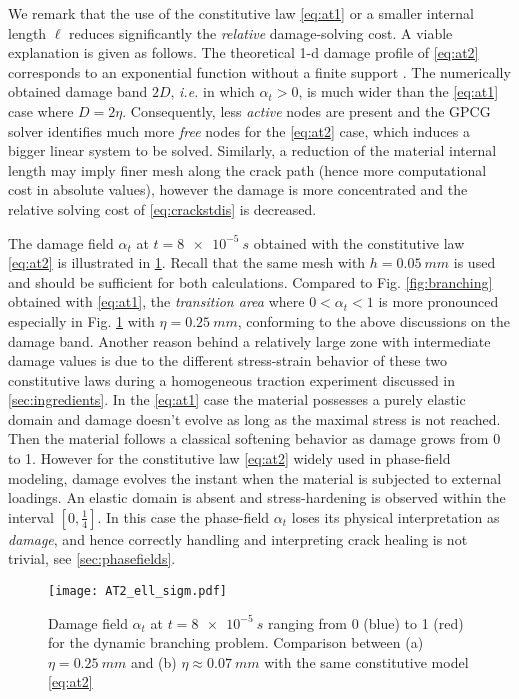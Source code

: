 We remark that the use of the constitutive law \eqref{eq:at1} or a smaller internal length $\ell$ reduces significantly the \emph{relative} damage-solving cost. A viable explanation is given as follows. The theoretical 1-d damage profile of \eqref{eq:at2} corresponds to an exponential function without a finite support \cite{BourdinFrancfortMarigo:2008,MieheHofackerWelschinger:2010}. The  numerically obtained damage band $2D$, \emph{i.e.} in which $\alpha_t>0$, is much wider than the \eqref{eq:at1} case where $D=2\eta$. Consequently, less \emph{active} nodes are present and the GPCG solver identifies much more \emph{free} nodes for the \eqref{eq:at2} case, which induces a bigger linear system to be solved. Similarly, a reduction of the material internal length may imply finer mesh along the crack path (hence more computational cost in absolute values), however the damage is more concentrated and the relative solving cost of \eqref{eq:crackstdis} is decreased.

The damage field $\alpha_t$ at $t=\SI{8e-5}{s}$ obtained with the constitutive law \eqref{eq:at2} is illustrated in \cref{fig:at2_ell_sigm}. Recall that the same mesh with $h=\SI{0.05}{mm}$ is used and should be sufficient for both calculations. Compared to Fig. \ref{fig:branching} obtained with \eqref{eq:at1}, the \emph{transition area} where $0<\alpha_t<1$ is more pronounced especially in Fig. \ref{fig:at2_ell_sigm} with $\eta=\SI{0.25}{mm}$, conforming to the above discussions on the damage band. Another reason behind a relatively large zone with intermediate damage values is due to the different stress-strain behavior of these two constitutive laws during a homogeneous traction experiment discussed in \cref{sec:ingredients}. In the \eqref{eq:at1} case the material possesses a purely elastic domain and damage doesn't evolve as long as the maximal stress is not reached. Then the material follows a classical softening behavior as damage grows from 0 to 1. However for the constitutive law \eqref{eq:at2} widely used in phase-field modeling, damage evolves the instant when the material is subjected to external loadings. An elastic domain is absent and stress-hardening is observed within the interval $[0,\frac{1}{4}]$. In this case the phase-field $\alpha_t$ loses its physical interpretation as \emph{damage}, and hence correctly handling and interpreting crack healing is not trivial, see \cref{sec:phasefields}.
\begin{figure}[htbp]
\centering
\texttt{[image: AT2\_ell\_sigm.pdf]}
\caption{Damage field $\alpha_t$ at $t=\SI{8e-5}{s}$ ranging from 0 (blue) to 1 (red) for the dynamic branching problem. Comparison between (a) $\eta=\SI{0.25}{mm}$ and (b) $\eta\approx\SI{0.07}{mm}$ with the same constitutive model \eqref{eq:at2}} \label{fig:at2_ell_sigm}
\end{figure}

